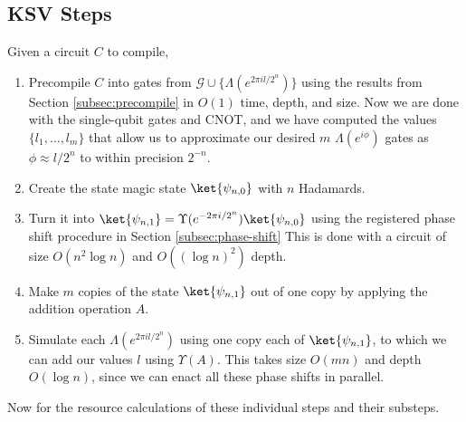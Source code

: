 \subsection{KSV Steps}

Given a circuit $C$ to compile,

\begin{enumerate}
\item Precompile $C$ into gates from $\mathcal{G} \cup \{\Lambda(e^{2\pi i l / 2^n})\}$
using the results from Section \ref{subsec:precompile} in $O(1)$ time, depth,
and size.
Now we are done with the single-qubit gates and CNOT, and we have computed
the values $\{l_1, \ldots , l_m\}$ that allow us to approximate our
desired $m$
$\Lambda(e^{i\phi})$ gates as $\phi \approx l/2^n$ to within precision
$2^{-n}$.
\item Create the state magic state $\ket{\psi_{n,0}}$ with $n$ Hadamards.
\item Turn it into $\ket{\psi_{n,1}} = \Upsilon(e^{-2\pi i / 2^n}) \ket{\psi_{n,0}}$
using the registered phase shift procedure in Section \ref{subsec:phase-shift}
This is done with a circuit of size $O(n^2\log n)$ and $O((\log n)^2)$ depth.
\item Make $m$ copies of the state $\ket{\psi_{n,1}}$ out of one copy by 
applying the addition operation $A$.
\item Simulate each $\Lambda(e^{2\pi i l / 2^n})$
using one copy each of $\ket{\psi_{n,1}}$, to which we can add our
values $l$ using $\Upsilon(A)$.
This takes size $O(mn)$ and depth $O(\log n)$, since we can enact
all these phase shifts in parallel.
\end{enumerate}

Now for the resource calculations of these individual steps and their
substeps.













